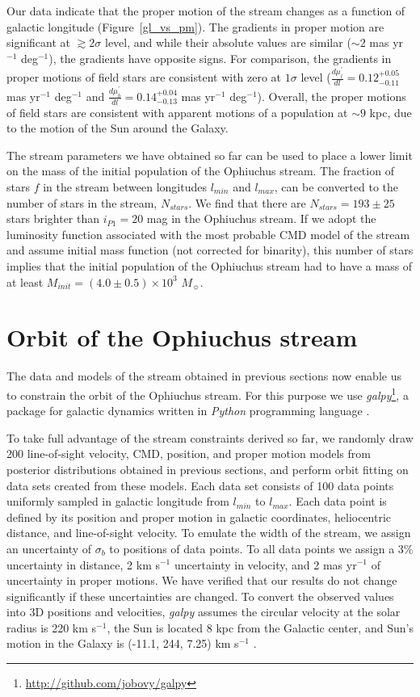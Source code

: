 \documentclass[iop]{emulateapj}
\begin{document}
Our data indicate that the proper motion of the stream changes as a function of
galactic longitude (Figure~\ref{gl_vs_pm}). The gradients in proper motion
are significant at $\gtrsim2\sigma$ level, and while their absolute values are
similar ($\sim2$ mas yr$^{-1}$ deg$^{-1}$), the gradients have opposite signs.
For comparison, the gradients in proper motions of field stars are consistent
with zero at $1\sigma$ level ($\frac{d\mu^\prime_l}{dl}=0.12_{-0.11}^{+0.05}$
mas yr$^{-1}$ deg$^{-1}$ and $\frac{d\mu^\prime_b}{dl}=0.14_{-0.13}^{+0.04}$ mas
yr$^{-1}$ deg$^{-1}$). Overall, the proper motions of field stars are consistent
with apparent motions of a population at $\sim9$ kpc, due to the motion of the
Sun around the Galaxy.

The stream parameters we have obtained so far can be used to place a lower limit
on the mass of the initial population of the Ophiuchus stream. The fraction of
stars $f$ in the stream between longitudes $l_{min}$ and $l_{max}$, can be
converted to the number of stars in the stream, $N_{stars}$. We find that there
are $N_{stars}=193\pm25$ stars brighter than $i_{P1}=20$ mag in the Ophiuchus
stream. If we adopt the luminosity function associated with the most probable
CMD model of the stream and assume \citet{kro98} initial mass function (not
corrected for binarity), this number of stars implies that the initial
population of the Ophiuchus stream had to have a mass of at least
$M_{init}=(4.0\pm0.5)\times10^3$ $M_{\sun}$.

\section{Orbit of the Ophiuchus stream}\label{orbit}

The data and models of the stream obtained in previous sections now enable us to
constrain the orbit of the Ophiuchus stream. For this purpose we use
{\em galpy}\footnote{\url{http://github.com/jobovy/galpy}}, a package for
galactic dynamics written in {\em Python} programming language \citep{bov15}.

To take full advantage of the stream constraints derived so far, we randomly
draw 200 line-of-sight velocity, CMD, position, and proper motion models from
posterior distributions obtained in previous sections, and perform orbit fitting
on data sets created from these models. Each data set consists of 100 data
points uniformly sampled in galactic longitude from $l_{min}$ to $l_{max}$. Each
data point is defined by its position and proper motion in galactic coordinates,
heliocentric distance, and line-of-sight velocity. To emulate the width of the
stream, we assign an uncertainty of $\sigma_b$ to positions of data points. To
all data points we assign a 3\% uncertainty in distance, 2 km s$^{-1}$
uncertainty in velocity, and 2 mas yr$^{-1}$ of uncertainty in proper motions.
We have verified that our results do not change significantly if these
uncertainties are changed. To convert the observed values into 3D positions and
velocities, {\em galpy} assumes the circular velocity at the solar radius is 220
km s$^{-1}$, the Sun is located 8 kpc from the Galactic center, and Sun's motion
in the Galaxy is (-11.1, 244, 7.25) km s$^{-1}$ \citep{sbd10, bov12}.
\end{document}

